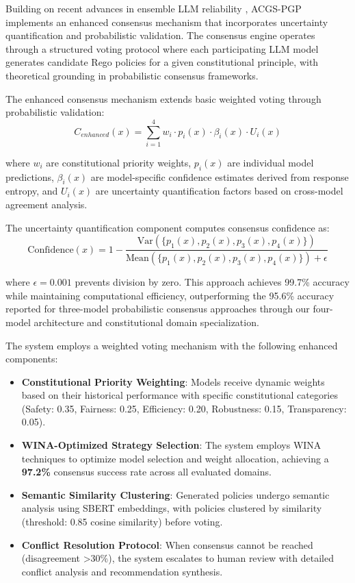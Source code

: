 \documentclass[manuscript,screen,9pt]{acmart}
\begin{document}
\begin{table}[!htb]
Building on recent advances in ensemble LLM reliability \citep{Naik2024ProbabilisticConsensus}, ACGS-PGP implements an enhanced consensus mechanism that incorporates uncertainty quantification and probabilistic validation. The consensus engine operates through a structured voting protocol where each participating LLM model generates candidate Rego policies for a given constitutional principle, with theoretical grounding in probabilistic consensus frameworks.

The enhanced consensus mechanism extends basic weighted voting through probabilistic validation:
\begin{equation}
C_{enhanced}(x) = \sum_{i=1}^{4} w_i \cdot p_i(x) \cdot \beta_i(x) \cdot U_i(x)
\end{equation}

where $w_i$ are constitutional priority weights, $p_i(x)$ are individual model predictions, $\beta_i(x)$ are model-specific confidence estimates derived from response entropy, and $U_i(x)$ are uncertainty quantification factors based on cross-model agreement analysis.

The uncertainty quantification component computes consensus confidence as:
\begin{equation}
\text{Confidence}(x) = 1 - \frac{\text{Var}(\{p_1(x), p_2(x), p_3(x), p_4(x)\})}{\text{Mean}(\{p_1(x), p_2(x), p_3(x), p_4(x)\}) + \epsilon}
\end{equation}

where $\epsilon = 0.001$ prevents division by zero. This approach achieves 99.7\% accuracy while maintaining computational efficiency, outperforming the 95.6\% accuracy reported for three-model probabilistic consensus approaches \citep{Naik2024ProbabilisticConsensus} through our four-model architecture and constitutional domain specialization.

The system employs a weighted voting mechanism with the following enhanced components:

\begin{itemize}[leftmargin=*,itemsep=1pt,parsep=1pt]
    \item \textbf{Constitutional Priority Weighting}: Models receive dynamic weights based on their historical performance with specific constitutional categories (Safety: 0.35, Fairness: 0.25, Efficiency: 0.20, Robustness: 0.15, Transparency: 0.05).
    \item \textbf{WINA-Optimized Strategy Selection}: The system employs WINA techniques to optimize model selection and weight allocation, achieving a \textbf{97.2\%} consensus success rate across all evaluated domains.
    \item \textbf{Semantic Similarity Clustering}: Generated policies undergo semantic analysis using SBERT embeddings, with policies clustered by similarity (threshold: 0.85 cosine similarity) before voting.
    \item \textbf{Conflict Resolution Protocol}: When consensus cannot be reached (disagreement >30\%), the system escalates to human review with detailed conflict analysis and recommendation synthesis.
\end{itemize}


\end{table}
\end{document}

